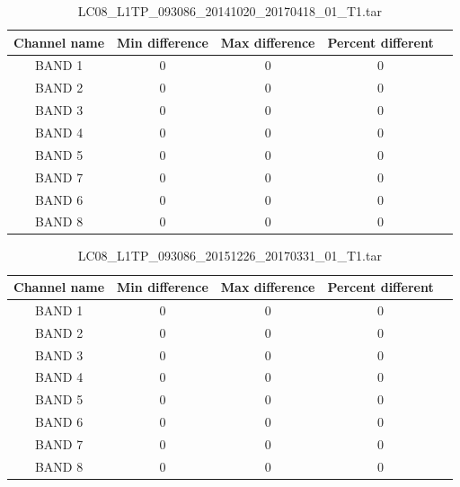 \documentclass[a4paper]{article}
\begin{document}
    \begin{table}[ht!]
      \caption{LC08\_L1TP\_093086\_20141020\_20170418\_01\_T1.tar}\label{table:10}
      \centering
      \small
      \begin{tabular}{ccccc} \midrule
        \textbf{Channel name} & \textbf{Min difference} & \textbf{Max difference} & \textbf{Percent different} \\ \midrule
        BAND 1 & 0 & 0 & 0 \\
        BAND 2 & 0 & 0 & 0 \\
        BAND 3 & 0 & 0 & 0 \\
        BAND 4 & 0 & 0 & 0 \\
        BAND 5 & 0 & 0 & 0 \\
        BAND 7 & 0 & 0 & 0 \\
        BAND 6 & 0 & 0 & 0 \\
        BAND 8 & 0 & 0 & 0 \\ \midrule
      \end{tabular}
    \end{table}

  \clearpage

    \begin{table}[ht!]
      \caption{LC08\_L1TP\_093086\_20151226\_20170331\_01\_T1.tar}\label{table:11}
      \centering
      \small
      \begin{tabular}{ccccc} \midrule
        \textbf{Channel name} & \textbf{Min difference} & \textbf{Max difference} & \textbf{Percent different} \\ \midrule
        BAND 1 & 0 & 0 & 0 \\
        BAND 2 & 0 & 0 & 0 \\
        BAND 3 & 0 & 0 & 0 \\
        BAND 4 & 0 & 0 & 0 \\
        BAND 5 & 0 & 0 & 0 \\
        BAND 6 & 0 & 0 & 0 \\
        BAND 7 & 0 & 0 & 0 \\
        BAND 8 & 0 & 0 & 0 \\ \midrule
      \end{tabular}
    \end{table}
\end{document}
